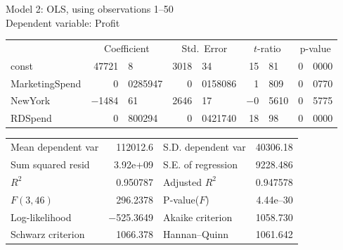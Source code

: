 \documentclass[11pt]{article}
\begin{document}
\thispagestyle{empty}

\begin{center}

Model 2: OLS, using observations 1--50\\
Dependent variable: Profit\\

\vspace{1em}

\begin{tabular}{lr@{.}lr@{.}lr@{.}lr@{.}l}
  &
 \multicolumn{2}{c}{Coefficient} &
  \multicolumn{2}{c}{Std.\ Error} &
   \multicolumn{2}{c}{$t$-ratio} &
    \multicolumn{2}{c}{p-value} \\[1ex]
const &
  47721&8 &
    3018&34 &
      15&81 &
        0&0000 \\
MarketingSpend &
  0&0285947 &
    0&0158086 &
      1&809 &
        0&0770 \\
NewYork &
  $-$1484&61 &
    2646&17 &
      $-$0&5610 &
        0&5775 \\
RDSpend &
  0&800294 &
    0&0421740 &
      18&98 &
        0&0000 \\
\end{tabular}

\vspace{1ex}
\begin{tabular}{lrlr}
Mean dependent var &  112012.6 & S.D. dependent var &  40306.18 \\
Sum squared resid &  3.92\textrm{e+09} & S.E. of regression &  9228.486 \\
$R^2$ &  0.950787 & Adjusted $R^2$ &  0.947578 \\
$F(3, 46)$ &  296.2378 & P-value($F$) &  4.44\textrm{e--30} \\
Log-likelihood & $-$525.3649 & Akaike criterion &  1058.730 \\
Schwarz criterion &  1066.378 & Hannan--Quinn &  1061.642 \\
\end{tabular}


\end{center}
\end{document}
